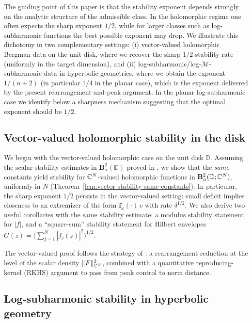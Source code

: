 \documentclass[a4paper,10pt]{amsart}
\newcommand{\D}{\mathbb{D}}
\begin{document}
The guiding point of this paper is that the stability exponent depends strongly on the analytic
structure of the admissible class. In the holomorphic regime one often expects the sharp exponent
$1/2$, while for larger classes such as log-subharmonic functions the best possible exponent may
drop. We illustrate this dichotomy in two complementary settings: (i) vector-valued holomorphic
Bergman data on the unit disk, where we recover the sharp $1/2$ stability rate (uniformly in the
target dimension), and (ii) log-subharmonic/log-$\mathcal M$-subharmonic data in hyperbolic
geometries, where we obtain the exponent $1/(n+2)$ (in particular $1/4$ in the planar case), which
is the exponent delivered by the present rearrangement-and-peak argument. In the planar
log-subharmonic case we identify below a sharpness mechanism suggesting that the optimal exponent
should be $1/2$.

\subsection{Vector-valued holomorphic stability in the disk}

We begin with the vector-valued holomorphic case on the unit disk $\D$.
Assuming the scalar stability estimates in $\mathbf B_\alpha^2(\D)$ proved in
\cite{GomezKalajMelentijevicRamos2025}, we show that the \emph{same} constants yield stability for
$\mathbb{C}^N$-valued holomorphic functions in $\mathbf B_\alpha^2(\D;\C^N)$, uniformly in $N$
(Theorem~\ref{lem:vector-stability-same-constants}). In particular, the sharp exponent $1/2$
persists in the vector-valued setting:
small deficit implies closeness to an extremizer of the form $\mathbf f_\omega(\cdot)\,v$ with rate
$\delta^{1/2}$. We also derive two useful corollaries with the same stability estimate: a modulus
stability statement for $|f|$, and a ``square-sum'' stability statement for Hilbert envelopes
$G(z)=\big(\sum_{j=1}^N|f_j(z)|^2\big)^{1/2}$.

The vector-valued proof follows the strategy of \cite{GomezKalajMelentijevicRamos2025}:
a rearrangement reduction at the level of the scalar density $\|F\|_{\mathbb{C}^N}^2$, combined with a
quantitative reproducing-kernel (RKHS) argument to pass from peak control to norm distance.

\subsection{Log-subharmonic stability in hyperbolic geometry}
\end{document}

